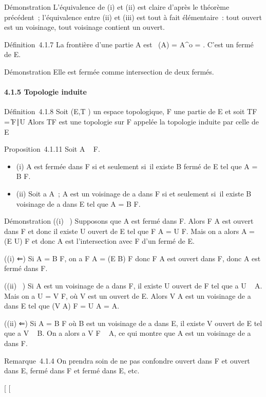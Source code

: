 Démonstration L'équivalence de (i) et (ii) est claire d'après le
théorème précédent~; l'équivalence entre (ii) et (iii) est tout à fait
élémentaire~: tout ouvert est un voisinage, tout voisinage contient un
ouvert.

Définition~4.1.7 La frontière d'une partie A est
\mathrmFr~(A) =
\overlineA \diagdown A^o =
\overlineA \bigcap\overlinecA. C'est un
fermé de E.

Démonstration Elle est fermée comme intersection de deux fermés.

\paragraph{4.1.5 Topologie induite}

Définition~4.1.8 Soit (E,T ) un espace topologique, F une partie de E et
soit TF = \U \bigcap F∣U
\inT\. Alors TF est une topologie sur F appelée
la topologie induite par celle de E

Proposition~4.1.11 Soit A \subset~ F.

\begin{itemize}
\itemsep1pt\parskip0pt
\item
  (i) A est fermée dans F si et seulement si~il existe B fermé de E tel
  que A = B \bigcap F.
\item
  (ii) Soit a \in A~; A est un voisinage de a dans F si et seulement si~il
  existe B voisinage de a dans E tel que A = B \bigcap F.
\end{itemize}

Démonstration ((i) \rigtharrow~) Supposons que A est fermé dans F. Alors F \diagdown A est
ouvert dans F et donc il existe U ouvert de E tel que F \diagdown A = U \bigcap F.
Mais on a alors A = (E \diagdown U) \bigcap F et donc A est l'intersection avec F d'un
fermé de E.

((i) ⇐) Si A = B \bigcap F, on a F \diagdown A = (E \diagdown B) \bigcap F donc F \diagdown A est ouvert
dans F, donc A est fermé dans F.

((ii) \rigtharrow~) Si A est un voisinage de a dans F, il existe U ouvert de F tel
que a \in U \subset~ A. Mais on a U = V \bigcap F, où V est un ouvert de E. Alors V \cup A
est un voisinage de a dans E tel que (V \cup A) \bigcap F = U \cup A = A.

((ii) ⇐) Si A = B \bigcap F où B est un voisinage de a dans E, il existe V
ouvert de E tel que a \in V \subset~ B. On a alors a \in V \bigcap F \subset~ A, ce qui montre
que A est un voisinage de a dans F.

Remarque~4.1.4 On prendra soin de ne pas confondre ouvert dans F et
ouvert dans E, fermé dans F et fermé dans E, etc.

{[}
{[}

